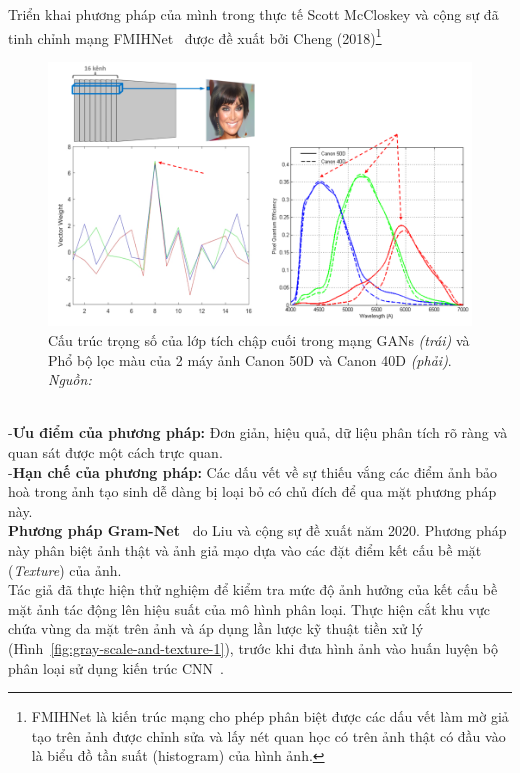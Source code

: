 %
Triển khai phương pháp của mình trong thực tế Scott McCloskey và cộng sự đã tinh chỉnh mạng FMIHNet~\cite{Chen2018FocusMD} được đề xuất bởi Cheng (2018)\footnote{FMIHNet là kiến trúc mạng cho phép phân biệt được các dấu vết làm mờ giả tạo trên ảnh được chỉnh sửa và lấy nét quan học có trên ảnh thật có đầu vào là biểu đồ tần suất (\gls{histogram}) của hình ảnh.}
%
\begin{figure}[h]
	\centering
	\includegraphics[width=0.9\linewidth]{Images/colors-weight-gan-camera-1b.png}
	\begin{minipage}{0.9\linewidth}
		\caption{Cấu trúc trọng số của lớp tích chập cuối trong mạng GANs  \textit{(trái)} và Phổ bộ lọc màu của 2 máy ảnh Canon 50D và Canon 40D \textit{(phải)}. \textit{Nguồn: \cite{8803661}}}
		\label{fig:colors-weight-gan-camera-1b}
	\end{minipage}
\end{figure}\\
%
-\textbf{Ưu điểm của phương pháp:} Đơn giản, hiệu quả, dữ liệu phân tích rõ ràng và quan sát được một cách trực quan.\\
-\textbf{Hạn chế của phương pháp:} Các dấu vết về sự thiếu vắng các điểm ảnh bảo hoà trong ảnh tạo sinh dễ dàng bị loại bỏ có chủ đích để qua mặt phương pháp này.\\
%
\textbf{Phương pháp Gram-Net~\cite{9157447}} do Liu và cộng sự đề xuất năm 2020. Phương pháp này phân biệt ảnh thật và ảnh giả mạo dựa vào các đặt điểm kết cấu bề mặt (\textit{Texture}) của ảnh.\\
%
Tác giả đã thực hiện thử nghiệm để kiểm tra mức độ ảnh hưởng của kết cấu bề mặt ảnh tác động lên hiệu suất của mô hình phân loại. Thực hiện cắt khu vực chứa vùng da mặt trên ảnh và áp dụng lần lược kỹ thuật tiền xử lý (Hình~\ref{fig:gray-scale-and-texture-1}), trước khi đưa hình ảnh vào huấn luyện bộ phân loại sử dụng kiến trúc CNN~\cite{Krizhevsky2012ImageNetCW}.
